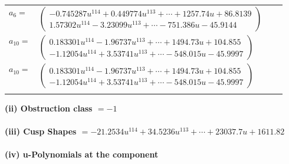 \documentclass[1p]{elsarticle_modified}
\theoremstyle{definition}
\begin{document}
\begin{tabular}{m{7pt} m{180pt} m{7pt} m{180pt} }
\flushright $a_{6}=$&$\begin{pmatrix}-0.745287 u^{114}+0.449774 u^{113}+\cdots+1257.74 u+86.8139\\1.57302 u^{114}-3.23099 u^{113}+\cdots-751.386 u-45.9144\end{pmatrix}$ \\
\flushright $a_{10}=$&$\begin{pmatrix}0.183301 u^{114}-1.96737 u^{113}+\cdots+1494.73 u+104.855\\-1.12054 u^{114}+3.53741 u^{113}+\cdots-548.015 u-45.9997\end{pmatrix}$\\ \flushright $a_{10}=$&$\begin{pmatrix}0.183301 u^{114}-1.96737 u^{113}+\cdots+1494.73 u+104.855\\-1.12054 u^{114}+3.53741 u^{113}+\cdots-548.015 u-45.9997\end{pmatrix}$\\&\end{tabular}
\flushleft \textbf{(ii) Obstruction class $= -1$}\\~\\
\flushleft \textbf{(iii) Cusp Shapes $= -21.2534 u^{114}+34.5236 u^{113}+\cdots+23037.7 u+1611.82$}\\~\\
\newpage\renewcommand{\arraystretch}{1}
\flushleft \textbf{(iv) u-Polynomials at the component}\newline \\
\end{document}

